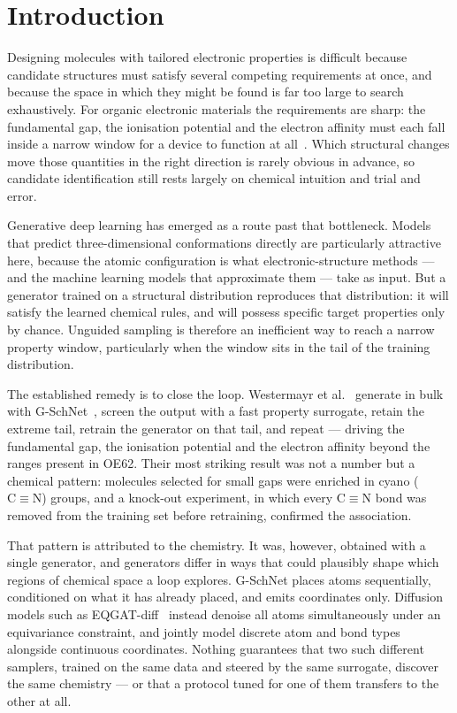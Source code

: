 \documentclass[runningheads]{llncs}
\begin{document}
\section{Introduction}

Designing molecules with tailored electronic properties is difficult
because candidate structures must satisfy several competing
requirements at once, and because the space in which they might be
found is far too large to search exhaustively. For organic electronic
materials the requirements are sharp: the fundamental gap, the
ionisation potential and the electron affinity must each fall inside a
narrow window for a device to function at
all~\cite{westermayr2022,stuke2020}. Which structural changes move
those quantities in the right direction is rarely obvious in advance,
so candidate identification still rests largely on chemical intuition
and trial and error.

Generative deep learning has emerged as a route past that bottleneck.
Models that predict three-dimensional conformations directly are
particularly attractive here, because the atomic configuration is what
electronic-structure methods --- and the machine learning models that
approximate them --- take as input. But a generator trained on a
structural distribution reproduces that distribution: it will satisfy
the learned chemical rules, and will possess specific target properties
only by chance. Unguided sampling is therefore an inefficient way to
reach a narrow property window, particularly when the window sits in
the tail of the training distribution.

The established remedy is to close the loop. Westermayr et
al.~\cite{westermayr2022} generate in bulk with
G-SchNet~\cite{gebauer2019}, screen the output with a fast property
surrogate, retain the extreme tail, retrain the generator on that tail,
and repeat --- driving the fundamental gap, the ionisation potential
and the electron affinity beyond the ranges present in OE62. Their most
striking result was not a number but a chemical pattern: molecules
selected for small gaps were enriched in cyano
($\mathrm{C}\!\equiv\!\mathrm{N}$) groups, and a knock-out experiment,
in which every C$\equiv$N bond was removed from the training set before
retraining, confirmed the association.

That pattern is attributed to the chemistry. It was, however, obtained
with a single generator, and generators differ in ways that could
plausibly shape which regions of chemical space a loop explores.
G-SchNet places atoms sequentially, conditioned on what it has already
placed, and emits coordinates only. Diffusion models such as
EQGAT-diff~\cite{le2023} instead denoise all atoms simultaneously under
an equivariance constraint, and jointly model discrete atom and bond
types alongside continuous coordinates. Nothing guarantees that two
such different samplers, trained on the same data and steered by the
same surrogate, discover the same chemistry --- or that a protocol
tuned for one of them transfers to the other at all.
\end{document}
